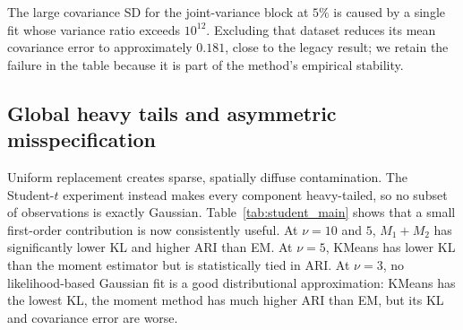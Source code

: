 \documentclass[11pt,a4paper]{article}
\newcommand{\Mone}{M_1}
\newcommand{\Mtwo}{M_2}
\begin{document}
The large covariance SD for the joint-variance block at $5\%$ is caused by a
single fit whose variance ratio exceeds $10^{12}$.  Excluding that dataset
reduces its mean covariance error to approximately $0.181$, close to the
legacy result; we retain the failure in the table because it is part of the
method's empirical stability.

\FloatBarrier
\subsection{Global heavy tails and asymmetric misspecification}
\label{sec:heavy_tails}

Uniform replacement creates sparse, spatially diffuse contamination.  The
Student-$t$ experiment instead makes every component heavy-tailed, so no
subset of observations is exactly Gaussian.  Table~\ref{tab:student_main}
shows that a small first-order contribution is now consistently useful.  At
$\nu=10$ and $5$, $\Mone+\Mtwo$ has significantly lower KL and higher ARI
than EM.  At $\nu=5$, KMeans has lower KL than the moment estimator but is
statistically tied in ARI.  At $\nu=3$, no likelihood-based Gaussian fit is a
good distributional approximation: KMeans has the lowest KL, the moment
method has much higher ARI than EM, but its KL and covariance error are worse.
\end{document}
